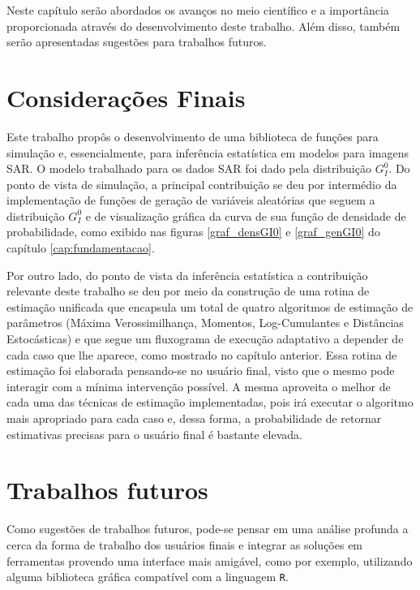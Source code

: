 
Neste capítulo serão abordados os avanços no meio científico e a importância proporcionada através do desenvolvimento deste trabalho. Além disso, também serão apresentadas sugestões para trabalhos futuros.

\section{Considerações Finais}

Este trabalho propôs o desenvolvimento de uma biblioteca de funções para simulação e, essencialmente, para inferência estatística em modelos para imagens SAR. O modelo trabalhado para os dados SAR foi dado pela distribuição $G_I^0$. Do ponto de vista de simulação, a principal contribuição se deu por intermédio da implementação de funções de geração de variáveis aleatórias que seguem a distribuição $G_I^0$ e de visualização gráfica da curva de sua função de densidade de probabilidade, como exibido nas figuras \ref{graf_densGI0} e \ref{graf_genGI0} do capítulo \ref{cap:fundamentacao}.

Por outro lado, do ponto de vista da inferência estatística a contribuição relevante deste trabalho se deu por meio da construção de uma rotina de estimação unificada que encapsula um total de quatro algoritmos de estimação de parâmetros (Máxima Verossimilhança, Momentos, Log-Cumulantes e Distâncias Estocásticas) e que segue um fluxograma de execução adaptativo a depender de cada caso que lhe aparece, como mostrado no capítulo anterior. Essa rotina de estimação foi elaborada pensando-se no usuário final, visto que o mesmo pode interagir com a mínima intervenção possível. A mesma aproveita o melhor de cada uma das técnicas de estimação implementadas, pois irá executar o algoritmo mais apropriado para cada caso e, dessa forma, a probabilidade de retornar estimativas precisas para o usuário final é bastante elevada.

\section{Trabalhos futuros}

Como sugestões de trabalhos futuros, pode-se pensar em uma análise profunda a cerca da forma de trabalho dos usuários finais e integrar as soluções em ferramentas provendo uma interface mais amigável, como por exemplo, utilizando alguma biblioteca gráfica compatível com a linguagem \texttt{R}. 

